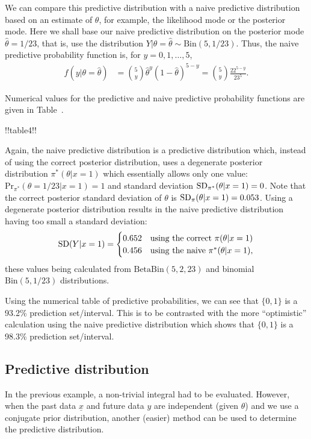 We can compare this predictive distribution with a naive predictive distribution based on an estimate of $\theta$, for example, the likelihood mode or the posterior mode. Here we shall base our naive predictive distribution on the posterior mode $\hat{\theta}=1/23$, that is, use the distribution $Y|\theta=\hat\theta\sim \mathrm{Bin}(5,1/23)$. Thus, the naive predictive probability function is, for $y=0,1,\ldots,5$,
\begin{align*}
f(y|\theta=\hat{\theta})&=\binom{5}{y}\hat{\theta}^y(1-\hat{\theta})^{5-y} 
=\binom{5}{y}\frac{22^{5-y}}{23^5}.
\end{align*}

Numerical values for the predictive and naive predictive probability functions are given in Table~.


!!table4!!

Again, the naive predictive distribution is a predictive
distribution which, instead of using the correct posterior
distribution, uses a degenerate posterior distribution
$\pi^*(\theta|x=1)$ which essentially allows only one value: $\text{Pr}_{\pi^*}(\theta=1/23|x=1)=1$ and
standard deviation $\textnormal{SD}_{\pi^*}(\theta|x=1)=0$. Note that the correct
posterior standard deviation of $\theta$ is
$\textnormal{SD}_\pi(\theta|x=1)=0.053$. Using a degenerate posterior distribution
results in the naive predictive distribution having too small a
standard deviation:
\begin{equation*}
\textnormal{SD}(Y|x=1)=
\begin{cases} 0.652 & \text{using the correct }\pi(\theta|x=1) \\
              0.456 & \text{using the naive }\pi^*(\theta|x=1), \\
\end{cases}
\end{equation*}
these values being calculated from $\mathrm{BetaBin}(5,2,23)$ and binomial
$\mathrm{Bin}(5,1/23)$ distributions.

Using the numerical table of predictive probabilities, we can see that
$\{0,1\}$ is a 93.2\% prediction set/interval. This is to be
contrasted with the more ``optimistic'' calculation using the naive
predictive distribution which shows that $\{0,1\}$ is a 98.3\%
prediction set/interval.

\clearpage

\subsection*{Predictive distribution}
In the previous example, a non-trivial integral had to be evaluated.
However, when the past data $\underline{x}$ and future data $y$ are
independent (given $\theta$) and we use a conjugate prior
distribution, another (easier) method can be used to determine the
predictive distribution.

